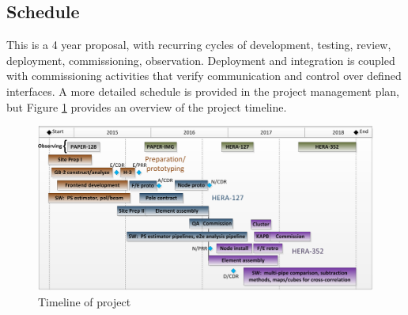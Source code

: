 \documentclass[preprint]{aastex}
\newcommand{\compress}{\vspace{-0.3in}}
\begin{document}

%


\compress
\subsection{Schedule} %

This is a 4 year proposal, with recurring cycles of development, testing, review, deployment, commissioning, observation.   Deployment and integration is coupled with commissioning activities that verify communication and control over defined interfaces.  A more detailed schedule is provided in the project management plan, but Figure \ref{fig:timeline} provides an overview of the project timeline. 

\begin{figure}[ht]\centering
\includegraphics[width=5.5in]{otherdocs/schedule.png}
\caption{\small Timeline of project}
\label{fig:timeline}
\end{figure}
\end{document}
